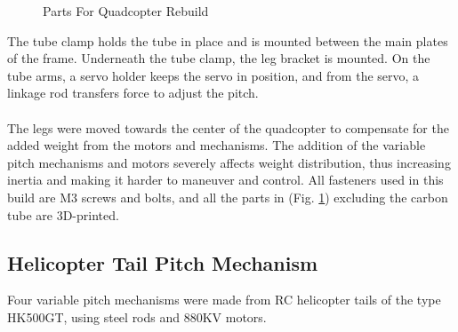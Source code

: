 \begin{figure}[h]
\begin{minipage}[b]{0.35\textwidth}
            \caption{Parts For Quadcopter Rebuild}
           \label{fig:PartsForArdu}
        \end{minipage}
\end{figure}

\noindent
The tube clamp holds the tube in place and is mounted between the main plates of the frame. Underneath the tube clamp, the leg bracket is mounted. On the tube arms, a servo holder keeps the servo in position, and from the servo, a linkage rod transfers force to adjust the pitch.
\\\\
The legs were moved towards the center of the quadcopter to compensate for the added weight from the motors and mechanisms. The addition of the variable pitch mechanisms and motors severely affects weight distribution, thus increasing inertia and making it harder to maneuver and control. All fasteners used in this build are M3 screws and bolts, and all the parts in (Fig. \ref{fig:PartsForArdu}) excluding the carbon tube are 3D-printed. 
\newpage
\subsection{Helicopter Tail Pitch Mechanism}

Four variable pitch mechanisms were made from RC helicopter tails of the type HK500GT, using steel rods and 880KV motors.

